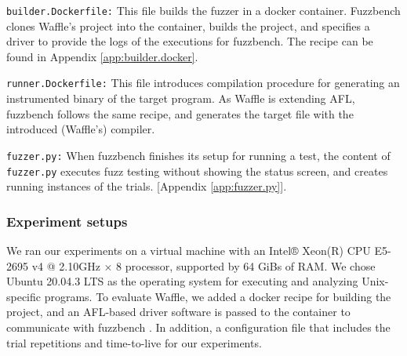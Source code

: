 \begin{itemize}
    \begin{sloppypar}
    \item \texttt{builder.Dockerfile:} This file builds the fuzzer in a docker container. Fuzzbench clones Waffle's project into the container, builds the project, and specifies a driver to provide the logs of the executions for fuzzbench. The recipe can be found in Appendix \ref{app:builder.docker}.
    \end{sloppypar}
    \item \texttt{runner.Dockerfile:} This file introduces compilation procedure for generating an instrumented binary of the target program. As Waffle is extending AFL, fuzzbench follows the same recipe, and generates the target file with the introduced (Waffle's) compiler.
    
    \item \texttt{fuzzer.py:} When fuzzbench finishes its setup for running a test, the content of \texttt{fuzzer.py} executes fuzz testing without showing the status screen, and creates running instances of the trials. [Appendix \ref{app:fuzzer.py}].
\end{itemize}


\subsubsection{Experiment setups}

We ran our experiments on a virtual machine with an Intel® Xeon(R) CPU E5-2695 v4 @ 2.10GHz × 8 processor, supported by 64 GiBs of RAM. We chose Ubuntu 20.04.3 LTS as the operating system for executing and analyzing Unix-specific programs. To evaluate Waffle, we added a docker recipe for building the project, and an AFL-based driver software is passed to the container to communicate with fuzzbench \cite{afl_driver}. In addition, a configuration file that includes the trial repetitions and time-to-live for our experiments.

